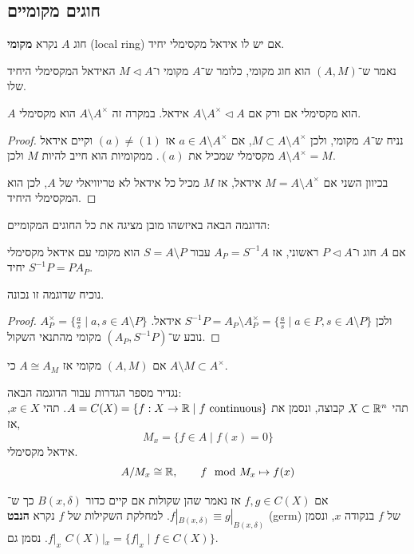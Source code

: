 \subsection{חוגים מקומיים}
\begin{definition}
	חוג $A$ נקרא \textbf{מקומי} (local ring) אם יש לו אידאל מקסימלי יחיד.
\end{definition}
\begin{notation}
	נאמר ש־$(A, M)$ הוא חוג מקומי, כלומר ש־$A$ מקומי ו־$M \triangleleft A$ האידאל המקסימלי היחיד שלו.
\end{notation}
\begin{proposition}
	$A$ הוא מקסימלי אם ורק אם $A \setminus A^\times \triangleleft A$ אידאל.
	במקרה זה $A \setminus A^\times$ הוא מקסימלי.
\end{proposition}
\begin{proof}
	נניח ש־$A$ מקומי, ולכן $M \subset A \setminus A^\times$, אם $a \in A \setminus A^\times$ אז $(a) \ne (1)$ וקיים אידאל מקסימלי שמכיל את $(a)$.
	ממקומיות הוא חייב להיות $M$ ולכן $A \setminus A^\times = M$.

	בכיוון השני אם $M = A \setminus A^\times$ אידאל, אז $M$ מכיל כל אידאל לא טריוויאלי של $A$, לכן הוא המקסימלי היחיד.
\end{proof}
הדוגמה הבאה באיזשהו מובן מציגה את כל החוגים המקומיים:
\begin{example}
	אם $A$ חוג ו־$P \triangleleft A$ ראשוני, אז $A_P = S^{-1} A$ עבור $S = A \setminus P$ הוא מקומי עם אידאל מקסימלי יחיד $S^{-1} P = P A_P$.
\end{example}
נוכיח שדוגמה זו נכונה.
\begin{proof}
	$A_P^\times = \{ \frac{a}{s} \mid a, s \in A \setminus P \}$ ולכן $S^{-1} P = A_P \setminus A_P^\times = \{ \frac{a}{s} \mid a \in P, s \in A \setminus P \}$ אידאל.
	נובע ש־$(A_P, S^{-1} P)$ מקומי מהתנאי השקול.
\end{proof}
\begin{corollary}
	אם $(A, M)$ מקומי אז $A \cong A_M$ כי $A \setminus M \subset A^\times$.
\end{corollary}
נגדיר מספר הגדרות עבור הדוגמה הבאה: \\
תהי $X \subset \mathbb{R}^n$ קבוצה, ונסמן את $A = C(X) = \{ f : X \to \mathbb{R} \mid f \text{ continuous} \}$.
תהי $x \in X$, אז,
\[
	M_x
	= \{ f \in A \mid f(x) = 0 \}
\]
אידאל מקסימלי.
\[
	A / M_x \cong \mathbb{R},
	\qquad
	f \mod M_x \mapsto f(x)
\]
\begin{definition}[נבט]
	אם $f, g \in C(X)$ אז נאמר שהן שקולות אם קיים כדור $B(x, \delta)$ כך ש־$f |_{B(x, \delta)} \equiv g |_{B(x, \delta)}$.
	למחלקת השקילות של $f$ נקרא \textbf{הנבט} (germ) של $f$ בנקודה $x$, ונסמן $f |_x$.
	נסמן גם $C(X) |_x = \{ f |_x \mid f \in C(X) \}$.
\end{definition}
